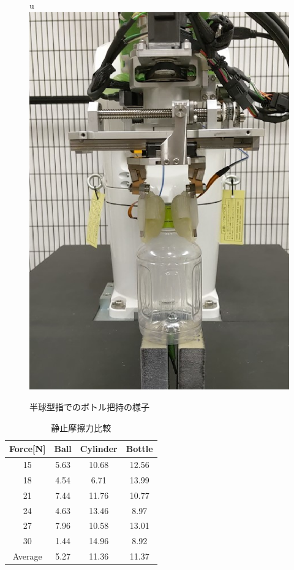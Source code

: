 \begin{figure}[htbp]
 \begin{center}u
  \includegraphics[scale=0.4]{../fig/eps/cap_grasp.eps}
 \caption{半球型指でのボトル把持の様子}
  \label{fig::cap_grasp}
 \end{center}
\end{figure}

\begin{table}[t]
    \caption{静止摩擦力比較}
   \label{tab::e3}
   \centering
   \begin{tabular}{|c||c|c|c|} \hline
   Force[N]   &Ball     &Cylinder      &Bottle    \\ \hline \hline
        15 & 5.63 & 10.68 & 12.56   \\ \hline
        18  & 4.54 & 6.71  & 13.99    \\ \hline
        21  & 7.44 & 11.76  & 10.77    \\ \hline
		24  & 4.63 & 13.46  & 8.97   \\ \hline
		27  & 7.96 & 10.58  & 13.01   \\ \hline			
		30 & 1.44 & 14.96  & 8.92   \\ \hline
		Average  & 5.27 & 11.36  & 11.37   \\ \hline
		 \end{tabular}
\end{table}

